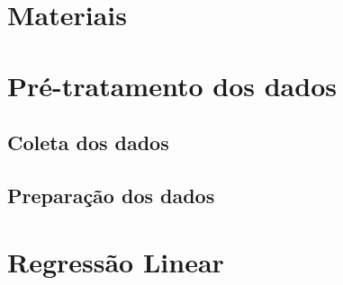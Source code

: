\chapter{Materiais}



\lipsum[100]



\chapter{Pré-tratamento dos dados}



\lipsum[100]



\section{Coleta dos dados}



\lipsum[100]



\section{Preparação dos dados}



\lipsum[100]



\chapter{Regressão Linear}


